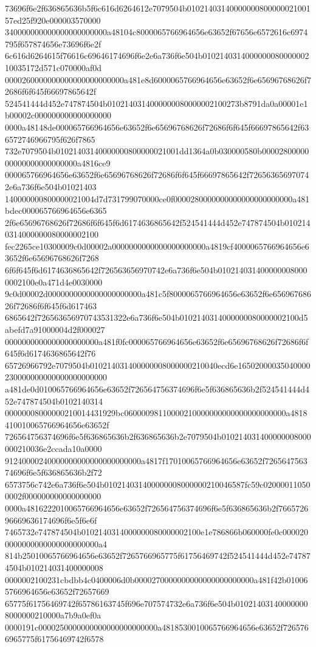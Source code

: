 {73696f6e2f636865636b5f6c616d6264612e7079504b0102140314000000080000002100157ed25f920e000003570000
340000000000000000000000a48104c8000065766964656e63652f67656e6572616c6974795f657874656e73696f6e2f
6c616d6264615f76616c69646174696f6e2e6a736f6e504b010214031400000008000000210035172d571c070000af0d
0000260000000000000000000000a481e8d6000065766964656e63652f6e65696768626f72686f6f645f66697865642f
524541444d452e747874504b0102140314000000080000002100273b8791da0a00001e1b00002c000000000000000000
0000a48148de000065766964656e63652f6e65696768626f72686f6f645f66697865642f636572746966795f626f7865
732e7079504b01021403140000000800000021001dd1364a0b030000580b0000280000000000000000000000a4816ce9
000065766964656e63652f6e65696768626f72686f6f645f66697865642f726563656970742e6a736f6e504b01021403
140000000800000021004d7d731799070000ce0f0000280000000000000000000000a481bdec000065766964656e6365
2f6e65696768626f72686f6f645f6d6174636865642f524541444d452e747874504b0102140314000000080000002100
fec2265ce10300009c0d00002a0000000000000000000000a4819cf4000065766964656e63652f6e65696768626f7268
6f6f645f6d6174636865642f726563656970742e6a736f6e504b0102140314000000080000002100e0a471d4e0030000
9c0d00002d0000000000000000000000a481c5f8000065766964656e63652f6e65696768626f72686f6f645f6d617463
6865642f726563656970743531322e6a736f6e504b0102140314000000080000002100d5abefd7a91000004d2f000027
0000000000000000000000a481f0fc000065766964656e63652f6e65696768626f72686f6f645f6d6174636865642f76
65726966792e7079504b010214031400000008000000210040ecd6e16502000035040000230000000000000000000000
a481de0d010065766964656e63652f726564756374696f6e5f636865636b2f524541444d452e747874504b0102140314
00000008000000210014431929bc06000098110000210000000000000000000000a4818410010065766964656e63652f
726564756374696f6e5f636865636b2f636865636b2e7079504b010214031400000008000000210036e2ccada10a0000
91240000240000000000000000000000a4817f17010065766964656e63652f726564756374696f6e5f636865636b2f72
6573756c742e6a736f6e504b010214031400000008000000210046587fc59c020000110500002f000000000000000000
0000a4816222010065766964656e63652f726564756374696f6e5f636865636b2f766572696669636174696f6e5f6e6f
7465732e747874504b0102140314000000080000002100e1e786866b060000fe0c0000200000000000000000000000a4
814b25010065766964656e63652f7265766965775f61756469742f524541444d452e747874504b010214031400000008
0000002100231cbdbb4c0400006d0b0000270000000000000000000000a481f42b010065766964656e63652f72657669
65775f61756469742f65786163745f696e707574732e6a736f6e504b010214031400000008000000210000a7b9a0ef0a
0000191c0000250000000000000000000000a4818530010065766964656e63652f7265766965775f61756469742f6578
}
